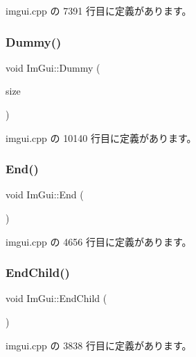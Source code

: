  imgui.\+cpp の 7391 行目に定義があります。

\mbox{\label{namespace_im_gui_a8b0fb07113251301ff897b8578a53f34}} 
\subsubsection{\texorpdfstring{Dummy()}{Dummy()}}
{\footnotesize\ttfamily void Im\+Gui\+::\+Dummy (\begin{DoxyParamCaption}\item[{const \mbox{\hyperlink{struct_im_vec2}{Im\+Vec2}} \&}]{size }\end{DoxyParamCaption})}



 imgui.\+cpp の 10140 行目に定義があります。

\mbox{\label{namespace_im_gui_a5479d93794a004c67ceb6d13f37c8254}} 
\subsubsection{\texorpdfstring{End()}{End()}}
{\footnotesize\ttfamily void Im\+Gui\+::\+End (\begin{DoxyParamCaption}{ }\end{DoxyParamCaption})}



 imgui.\+cpp の 4656 行目に定義があります。

\mbox{\label{namespace_im_gui_af8de559a88c1442d6df8c1b04c86e997}} 
\subsubsection{\texorpdfstring{End\+Child()}{EndChild()}}
{\footnotesize\ttfamily void Im\+Gui\+::\+End\+Child (\begin{DoxyParamCaption}{ }\end{DoxyParamCaption})}



 imgui.\+cpp の 3838 行目に定義があります。

\mbox{\label{namespace_im_gui_ac4bd9024554b5074805bc0ce3076c514}} 
